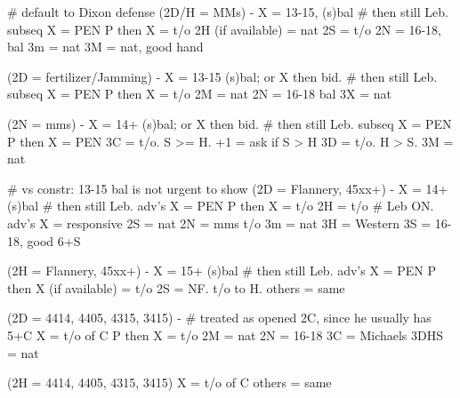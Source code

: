 # default to Dixon defense
(2D/H = MMs) -
X = 13-15, (s)bal  # then still Leb. subseq X = PEN
P then X = t/o
2H (if available) = nat
2S = t/o
2N = 16-18, bal
3m = nat
3M = nat, good hand

(2D = fertilizer/Jamming) -
X = 13-15 (s)bal; or X then bid.  # then still Leb. subseq X = PEN
P then X = t/o
2M = nat
2N = 16-18 bal
3X = nat

(2N = mms) - 
X = 14+ (s)bal; or X then bid.  # then still Leb. subseq X = PEN
P then X = PEN
3C = t/o. S >= H.
    +1 = ask if S > H
3D = t/o. H > S.
3M = nat

# vs constr: 13-15 bal is not urgent to show
(2D = Flannery, 45xx+) -
X = 14+ (s)bal  # then still Leb. adv's X = PEN
P then X = t/o
2H = t/o  # Leb ON. adv's X = responsive
2S = nat
2N = mms t/o
3m = nat
3H = Western
3S = 16-18, good 6+S

(2H = Flannery, 45xx+) -
X = 15+ (s)bal  # then still Leb. adv's X = PEN
P then X (if available) = t/o 
2S = NF. t/o to H.
others = same

(2D = 4414, 4405, 4315, 3415) -  # treated as opened 2C, since he usually has 5+C
X = t/o of C
P then X = t/o 
2M = nat
2N = 16-18
3C = Michaels
3DHS = nat

(2H = 4414, 4405, 4315, 3415)
X = t/o of C
others = same